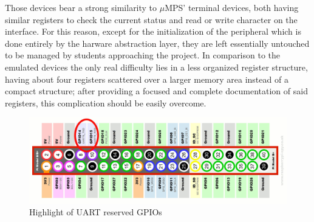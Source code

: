 \documentclass[12pt,a4paper,openright,twoside]{report}
\begin{document}
Those devices bear a strong similarity to $\mu$MPS' terminal devices, both having 
similar registers to check the current status and read or write character on the
interface. For this reason, except for the initialization of the peripheral
which is done entirely by the harware abstraction layer, they are left essentially
 untouched to be managed by students approaching the project. In comparison to 
 the emulated devices the only real difficulty lies in a less organized register
 structure, having about four registers scattered over a larger memory area instead
 of a compact structure; after providing a focused and complete documentation of 
 said registers, this complication should be easily overcome.

 \begin{figure}[t]
 \includegraphics[scale=0.143]{images/tesi2.jpg}
 \caption[Figure 2]{Highlight of UART reserved GPIOs}\label{fig:seconda}
 \end{figure}
\end{document}
